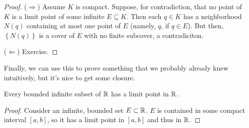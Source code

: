 \documentclass[../m131main.tex]{subfiles}
\begin{document}
\begin{proof}
    ($\Rightarrow$)
    Assume $K$ is compact.
    Suppose, for contradiction, that no point of $K$ is a limit point of some infinite $E \subseteq K$.
    Then each $q \in K$ has a neighborhood $N(q)$ containing at most one point of $E$ (namely, $q$, if $q \in E$).
    But then, $\left\{ N(q) \right\}$ is a cover of $E$ with no finite subcover, a contradiciton.

    ($\Leftarrow$) Exercise.
\end{proof}

Finally, we can use this to prove something that we probably already knew intuitively, but it's nice to get some closure.

\begin{corollary}
    Every bounded infinite subset of $\mathbb{R}$ has a limit point in $\mathbb{R}$.
\end{corollary}

\begin{proof}
    Consider an infinite, bounded set $E \subset \mathbb{R}$.
    $E$ is contained in some compact interval $[a,b]$, so it has a limit point in $[a,b]$ and thus in $\mathbb{R}$.
\end{proof}

\end{document}

